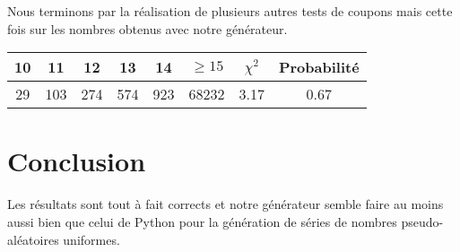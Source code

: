 \documentclass[12pt,a4paper]{article}
\begin{document}
Nous terminons par la réalisation de plusieurs autres tests de coupons mais
cette fois sur les nombres obtenus avec notre générateur.

\begin{center}
\begin{tabular}{c|c|c|c|c|c|c|c}
10 & 11 & 12 & 13 & 14 & $\geq 15$ & $\chi^2$ & Probabilité \\ \hline
29 & 103 & 274 & 574 & 923 & 68232 &  3.17 &  0.67
\end{tabular}
\end{center}


\section{Conclusion}
Les résultats sont tout à fait corrects et notre générateur semble faire
au moins aussi bien que celui de Python pour la génération de séries de nombres
pseudo-aléatoires uniformes.
\end{document}
